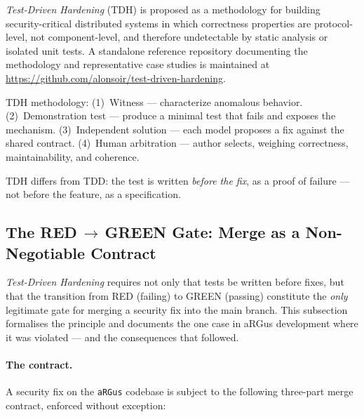 \documentclass[11pt,a4paper]{article}
\begin{document}
    \emph{Test-Driven Hardening} (TDH) is proposed as a methodology for building
    security-critical distributed systems in which correctness properties are protocol-level,
    not component-level, and therefore undetectable by static analysis or isolated unit tests.
    A standalone reference repository documenting the methodology and representative case studies
    is maintained at \url{https://github.com/alonsoir/test-driven-hardening}.

    TDH methodology: (1)~Witness --- characterize anomalous behavior. (2)~Demonstration test ---
    produce a minimal test that fails and exposes the mechanism. (3)~Independent solution ---
    each model proposes a fix against the shared contract. (4)~Human arbitration --- author
    selects, weighing correctness, maintainability, and coherence.

    TDH differs from TDD: the test is written \emph{before the fix}, as a proof of failure ---
    not before the feature, as a specification.



    \subsection{The RED\,$\to$\,GREEN Gate: Merge as a Non-Negotiable Contract}
    \label{subsec:red-green-gate}

    \emph{Test-Driven Hardening} requires not only that tests be written before fixes,
    but that the transition from RED (failing) to GREEN (passing) constitute the
    \emph{only} legitimate gate for merging a security fix into the main branch.
    This subsection formalises the principle and documents the one case in
    aRGus development where it was violated --- and the consequences that followed.

    \paragraph{The contract.}
    A security fix on the \texttt{aRGus} codebase is subject to the following
    three-part merge contract, enforced without exception:
\end{document}
